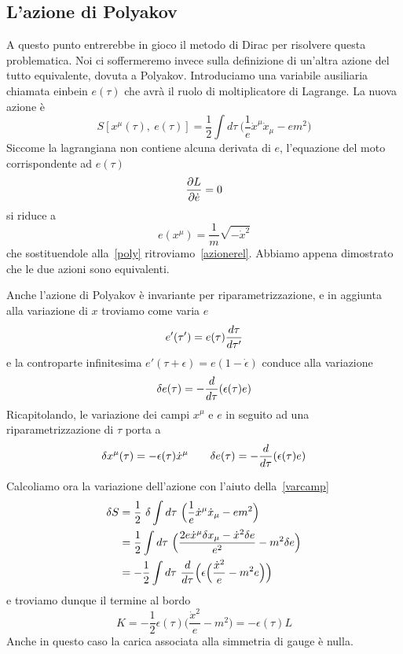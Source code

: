 \subsection{L'azione di Polyakov}
    A questo punto entrerebbe in gioco il metodo di Dirac per risolvere questa problematica. Noi ci soffermeremo invece sulla definizione di un'altra azione del tutto equivalente, dovuta a Polyakov. Introduciamo una variabile ausiliaria chiamata einbein $e(\tau)$ che avrà il ruolo di moltiplicatore di Lagrange. La nuova azione è
\begin{equation} \label{poly}
    S[x^\mu(\tau), ~ e(\tau)] = \frac{1}{2} \int d\tau ~ \Big( \frac{1}{e} \dot x^\mu \dot x_\mu - e m^2 \Big)
\end{equation}
    Siccome la lagrangiana non contiene alcuna derivata di $e$, l'equazione del moto corrispondente ad $e(\tau)$ 
\begin{equation*}
    \frac{\partial L}{\partial\dot e} = 0
\end{equation*}
    si riduce a
\begin{equation*}
    e(x^\mu) = \frac{1}{m} \sqrt{-\dot x^2}
\end{equation*}
    che sostituendole alla~\eqref{poly} ritroviamo~\eqref{azionerel}. Abbiamo appena dimostrato che le due azioni sono equivalenti. 

    Anche l'azione di Polyakov è invariante per riparametrizzazione, e in aggiunta alla variazione di $x$ troviamo come varia $e$
\begin{equation*}
    e'(\tau') = e(\tau) \frac{d\tau}{d\tau'}
\end{equation*}
    e la controparte infinitesima $e'(\tau + \epsilon) = e(1 - \dot \epsilon)$ conduce alla variazione
\begin{equation*}
    \delta e(\tau) = - \frac{d}{d\tau} (\epsilon(\tau) e)
\end{equation*}
    Ricapitolando, le variazione dei campi $x^\mu$ e $e$ in seguito ad una riparametrizzazione di $\tau$ porta a 
\begin{equation} \label{varcamp}
    \delta x^\mu(\tau) = - \epsilon(\tau) \dot x^\mu \qquad \delta e(\tau) = - \frac{d}{d\tau} (\epsilon(\tau) e)
\end{equation}

    Calcoliamo ora la variazione dell'azione con l'aiuto della~\eqref{varcamp}
\begin{equation*}
\begin{aligned}
    \delta S & = \frac{1}{2} ~ \delta \int d\tau ~ \Big( \frac{1}{e} \dot x^\mu \dot x_\mu - e m^2 \Big) \\ & = \frac{1}{2} \int d\tau ~ \Big ( \frac{2 e \dot x^\mu \delta x_\mu - \dot x^2 \delta e}{e^2} - m^2 \delta e \Big) \\ & = -\frac{1}{2} \int d\tau ~ \frac{d}{d\tau} \Big(\epsilon \Big (\frac{\dot x^2}{e} - m^2 e \Big )\Big)
\end{aligned}
\end{equation*}
    e troviamo dunque il termine al bordo  
\begin{equation*}
    K = - \frac{1}{2} \epsilon(\tau) \Big (\frac{\dot x^2}{e} - m^2\Big ) = - \epsilon(\tau) L
\end{equation*}
    Anche in questo caso la carica associata alla simmetria di gauge è nulla.

